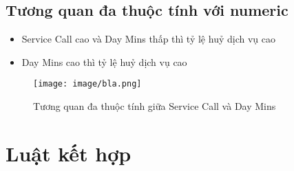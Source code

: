 \documentclass[a4paper, 12pt]{article}
\begin{document}
\subsection{Tương quan đa thuộc tính với numeric}

\begin{itemize}
    \item Service Call cao và Day Mins thấp thì tỷ lệ huỷ dịch vụ cao 
    \item Day Mins cao thì tỷ lệ huỷ dịch vụ cao 
\end{itemize}
\begin{figure}[H]
    \begin{center}
        \texttt{[image: image/bla.png]}
        \caption{Tương quan đa thuộc tính giữa Service Call và Day Mins}
    \end{center}
\end{figure}

\clearpage

\section{Luật kết hợp}
\end{document}
